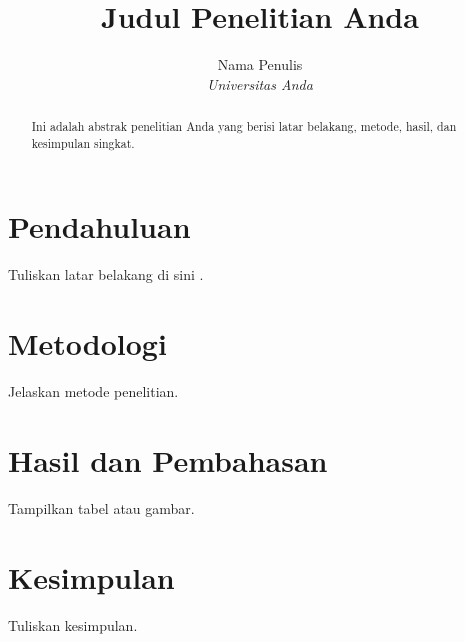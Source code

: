 \documentclass[10pt, twocolumn]{article} %
\title{Judul Penelitian Anda}
\author{Nama Penulis \\ \textit{Universitas Anda}}
\date{}
\begin{document}
\maketitle

\begin{abstract}
Ini adalah abstrak penelitian Anda yang berisi latar belakang, metode, hasil, dan kesimpulan singkat.
\end{abstract}

\section{Pendahuluan}
Tuliskan latar belakang di sini \cite{contoh_referensi}.

\section{Metodologi}
Jelaskan metode penelitian.

\section{Hasil dan Pembahasan}
Tampilkan tabel atau gambar.

\section{Kesimpulan}
Tuliskan kesimpulan.

\end{document}
